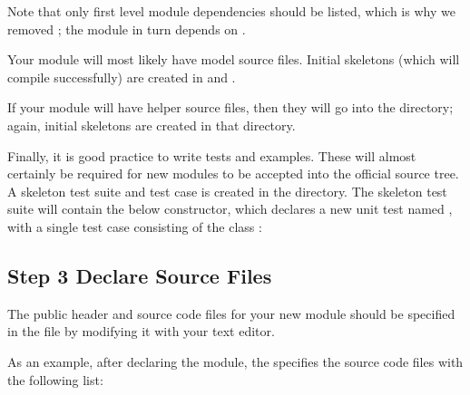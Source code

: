 \documentclass[letterpaper,10pt,english]{sphinxmanual}
\renewcommand{\sphinxcode}[1]{\texttt{\small{#1}}}
\begin{document}
Note that only first level module dependencies should be listed, which
is why we removed \sphinxcode{}; the \sphinxcode{} module in turn depends on
\sphinxcode{}.

Your module will most likely have model source files.  Initial skeletons
(which will compile successfully) are created in \sphinxcode{}
and \sphinxcode{}.

If your module will have helper source files, then they will go into
the \sphinxcode{} directory; again, initial skeletons are created
in that directory.

Finally, it is good practice to write tests and examples.  These will
almost certainly be required for new modules to be accepted into
the official  source tree.  A skeleton
test suite and test case is created in the \sphinxcode{} directory.
The skeleton test suite will contain the below constructor,
which declares a new unit test named \sphinxcode{},
with a single test case consisting of the class \sphinxcode{}:

\begin{sphinxVerbatim}[commandchars=\\\{\}]
 
     
    
\end{sphinxVerbatim}


\subsection{Step 3 \sphinxhyphen{} Declare Source Files}
\label{\detokenize{new-modules:step-3-declare-source-files}}
The public header and source code files for your new module
should be specified in the \sphinxcode{} file by modifying it with
your text editor.

As an example, after declaring the \sphinxcode{} module,
the \sphinxcode{} specifies the source code files
with the following list:
\end{document}
